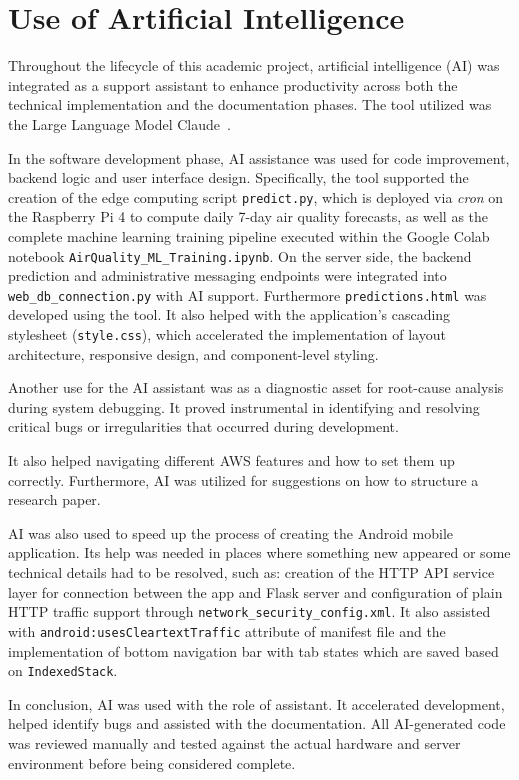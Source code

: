 
\chapter*{Use of Artificial Intelligence}
\label{ch:ai-usage}

Throughout the lifecycle of this academic project, artificial intelligence (AI) was integrated
as a support assistant to enhance productivity across both the technical implementation and the
documentation phases. The tool utilized was the Large Language Model
Claude~\cite{claudeai}.

In the software development phase, AI assistance was used for code improvement, backend logic
and user interface design. Specifically, the tool supported the creation of the edge computing
script \texttt{predict.py}, which is deployed via \textit{cron} on the Raspberry Pi 4 to
compute daily 7-day air quality forecasts, as well as the complete machine learning training
pipeline executed within the Google Colab notebook
\texttt{AirQuality\_ML\_Training.ipynb}. On the server side, the backend prediction and
administrative messaging endpoints were integrated into \texttt{web\_db\_connection.py} with
AI support. Furthermore \texttt{predictions.html} was developed using the tool. It also helped
with the application's cascading stylesheet (\texttt{style.css}), which accelerated the
implementation of layout architecture, responsive design, and component-level styling.

Another use for the AI assistant was as a diagnostic asset for root-cause analysis during
system debugging. It proved instrumental in identifying and resolving critical bugs or
irregularities that occurred during development.

It also helped navigating different AWS features and how to set them up correctly. Furthermore,
AI was utilized for suggestions on how to structure a research paper.

AI was also used to speed up the process of creating the Android mobile application. Its help
was needed in places where something new appeared or some technical details had to be resolved,
such as: creation of the HTTP API service layer for connection between the app and Flask server
and configuration of plain HTTP traffic support through \texttt{network\_security\_config.xml}.
It also assisted with \texttt{android:usesCleartextTraffic} attribute of manifest file and the
implementation of bottom navigation bar with tab states which are saved based on
\texttt{IndexedStack}.

In conclusion, AI was used with the role of assistant. It accelerated development, helped
identify bugs and assisted with the documentation. All AI-generated code was reviewed manually
and tested against the actual hardware and server environment before being considered complete.

